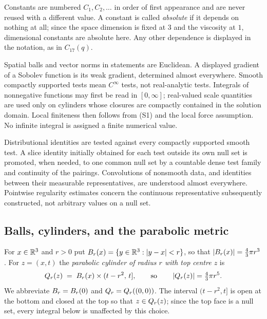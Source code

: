 \documentclass[11pt,reqno]{amsart}
\begin{document}
\begin{convention}\label{conv:constants}
Constants are numbered $C_{1},C_{2},\dots$ in order of first appearance and are
never reused with a different value. A constant is called \emph{absolute} if it
depends on nothing at all; since the space dimension is fixed at $3$ and the
viscosity at $1$, dimensional constants are absolute here. Any other dependence
is displayed in the notation, as in $C_{17}(q)$.
\end{convention}

\begin{convention}
Spatial balls and vector norms in statements are Euclidean. A displayed
gradient of a Sobolev function is its weak gradient, determined almost
everywhere. Smooth compactly supported tests mean $C^\infty$ tests, not
real-analytic tests. Integrals of nonnegative functions may first be read in
$[0,\infty]$; real-valued scale quantities are used only on cylinders whose
closures are compactly contained in the solution domain. Local finiteness
then follows from (S1) and the local force assumption. No infinite integral
is assigned a finite numerical value.

Distributional identities are tested against every compactly supported
smooth test. A slice identity initially obtained for each test outside its
own null set is promoted, when needed, to one common null set by a countable
dense test family and continuity of the pairings. Convolutions of nonsmooth
data, and identities between their measurable representatives, are understood
almost everywhere. Pointwise regularity estimates concern the continuous
representative subsequently constructed, not arbitrary values on a null set.
\end{convention}

\subsection{Balls, cylinders, and the parabolic metric}\label{ss:cylinders}

For $x\in\mathbb{R}^{3}$ and $r>0$ put $B_{r}(x)=\{y\in\mathbb{R}^{3}:\left\lvert y-x \right\rvert<r\}$, so that
$\left\lvert B_{r}(x) \right\rvert=\tfrac{4}{3}\pi r^{3}$. For $z=(x,t)$ the
\emph{parabolic cylinder of radius $r$ with top centre $z$} is
\begin{equation}\label{eq:cylinder}
  Q_{r}(z) \;=\; B_{r}(x)\times(t-r^{2},\,t],
  \qquad\text{so}\qquad
  \left\lvert Q_{r}(z) \right\rvert=\tfrac{4}{3}\pi r^{5}.
\end{equation}
We abbreviate $B_{r}=B_{r}(0)$ and $Q_{r}=Q_{r}((0,0))$. The interval
$(t-r^{2},t]$ is open at the bottom and closed at the top so that $z\in Q_{r}(z)$; since the top
face is a null set, every integral below is unaffected by this choice.
\end{document}
